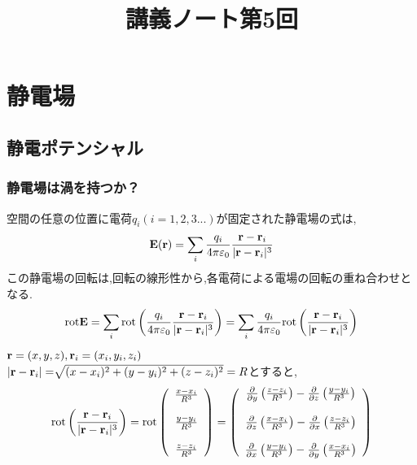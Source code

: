 \documentclass{jsarticle}
\title{講義ノート第5回}
\author{}
\date{}
\begin{document}
\maketitle

\section{静電場}

\setcounter{subsection}{10}

\subsection{静電ポテンシャル}
\subsubsection{静電場は渦を持つか？}
空間の任意の位置に電荷$q_i(i=1,2,3...)$が固定された静電場の式は,
\begin{eqnarray}
{\bf E}({\bf r})=\sum_i \frac{q_i}{4 \pi \varepsilon_0} \frac{{\bf r}-{\bf r}_i}{|{\bf r}-{\bf r}_i|^3}
\end{eqnarray}
この静電場の回転は,回転の線形性から,各電荷による電場の回転の重ね合わせとなる.
\begin{eqnarray}
{\rm rot}{\bf E} = \sum_i  {\rm rot} \left( \frac{q_i}{4 \pi \varepsilon_0} \frac{{\bf r}-{\bf r}_i}{|{\bf r}-{\bf r}_i|^3} \right) 
= \sum_i \frac{q_i}{4 \pi \varepsilon_0} {\rm rot} \left( \frac{{\bf r}-{\bf r}_i}{|{\bf r}-{\bf r}_i|^3} \right)
\end{eqnarray}
${\bf r}=(x,y,z), {\bf r}_i = (x_i,y_i,z_i)$ \\
$|{\bf r}-{\bf r}_i|=\sqrt[]{\mathstrut (x-x_i)^2+(y-y_i)^2+(z-z_i)^2}=R$とすると,
\begin{eqnarray}
{\rm rot}\left( \frac{{\bf r}-{\bf r}_i}{|{\bf r}-{\bf r}_i|^3} \right) =
{\rm rot}
\left( 
\begin{array}{cc}
\frac{x-x_i}{R^3} \\
\\
\frac{y-y_i}{R^3} \\
\\
\frac{z-z_i}{R^3} \\
\end{array}
\right)
=
\left( 
\begin{array}{cc}
\frac{\partial}{\partial y} \left( \frac{z-z_i}{R^3} \right) -\frac{\partial}{\partial z} \left( \frac{y-y_i}{R^3} \right) \\
\\
\frac{\partial}{\partial z} \left( \frac{x-x_i}{R^3} \right) -\frac{\partial}{\partial x} \left( \frac{z-z_i}{R^3} \right) \\
\\
\frac{\partial}{\partial x} \left( \frac{y-y_i}{R^3} \right) -\frac{\partial}{\partial y} \left( \frac{x-x_i}{R^3} \right) \\
\end{array}
\right)
\end{eqnarray}
\end{document}
